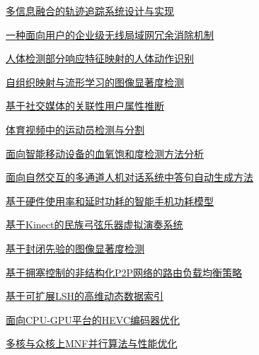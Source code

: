 \documentclass[a4paper]{article}
\begin{document}
\href{http://www.jos.org.cn/ch/reader/download_pdf.aspx?file_no=15021&year_id=2015&quarter_id=S2&falg=1}{多信息融合的轨迹追踪系统设计与实现}

\href{http://www.jos.org.cn/ch/reader/download_pdf.aspx?file_no=15022&year_id=2015&quarter_id=S2&falg=1}{一种面向用户的企业级无线局域网冗余消除机制}

\href{http://www.jos.org.cn/ch/reader/download_pdf.aspx?file_no=15023&year_id=2015&quarter_id=S2&falg=1}{人体检测部分响应特征映射的人体动作识别}

\href{http://www.jos.org.cn/ch/reader/download_pdf.aspx?file_no=15024&year_id=2015&quarter_id=S2&falg=1}{自组织映射与流形学习的图像显著度检测}

\href{http://www.jos.org.cn/ch/reader/download_pdf.aspx?file_no=15025&year_id=2015&quarter_id=S2&falg=1}{基于社交媒体的关联性用户属性推断}

\href{http://www.jos.org.cn/ch/reader/download_pdf.aspx?file_no=15026&year_id=2015&quarter_id=S2&falg=1}{体育视频中的运动员检测与分割}

\href{http://www.jos.org.cn/ch/reader/download_pdf.aspx?file_no=15027&year_id=2015&quarter_id=S2&falg=1}{面向智能移动设备的血氧饱和度检测方法分析}

\href{http://www.jos.org.cn/ch/reader/download_pdf.aspx?file_no=15028&year_id=2015&quarter_id=S2&falg=1}{面向自然交互的多通道人机对话系统中答句自动生成方法}

\href{http://www.jos.org.cn/ch/reader/download_pdf.aspx?file_no=15029&year_id=2015&quarter_id=S2&falg=1}{基于硬件使用率和延时功耗的智能手机功耗模型}

\href{http://www.jos.org.cn/ch/reader/download_pdf.aspx?file_no=15030&year_id=2015&quarter_id=S2&falg=1}{基于Kinect的民族弓弦乐器虚拟演奏系统}

\href{http://www.jos.org.cn/ch/reader/download_pdf.aspx?file_no=15031&year_id=2015&quarter_id=S2&falg=1}{基于封闭先验的图像显著度检测}

\href{http://www.jos.org.cn/ch/reader/download_pdf.aspx?file_no=15032&year_id=2015&quarter_id=S2&falg=1}{基于拥塞控制的非结构化P2P网络的路由负载均衡策略}

\href{http://www.jos.org.cn/ch/reader/download_pdf.aspx?file_no=15033&year_id=2015&quarter_id=S2&falg=1}{基于可扩展LSH的高维动态数据索引}

\href{http://www.jos.org.cn/ch/reader/download_pdf.aspx?file_no=15034&year_id=2015&quarter_id=S2&falg=1}{面向CPU-GPU平台的HEVC编码器优化}

\href{http://www.jos.org.cn/ch/reader/download_pdf.aspx?file_no=15035&year_id=2015&quarter_id=S2&falg=1}{多核与众核上MNF并行算法与性能优化}
\end{document}
